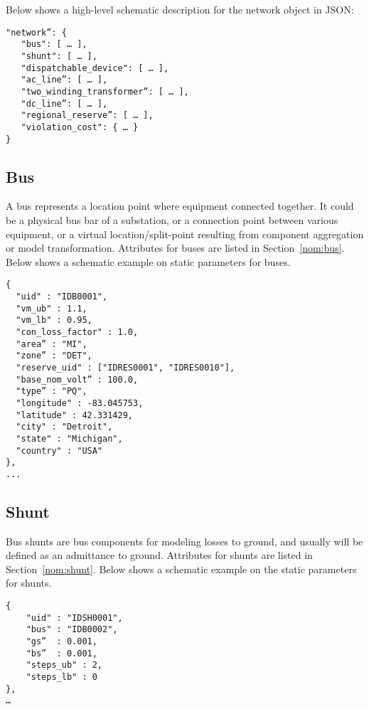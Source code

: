 Below shows a high-level schematic description for the network object in JSON:
\begin{verbatim}
"network”: {
   "bus": [ … ],
   "shunt": [ … ],
   "dispatchable_device": [ … ],
   "ac_line”: [ … ],
   "two_winding_transformer”: [ … ],
   "dc_line”: [ … ],   
   "regional_reserve”: [ … ],
   "violation_cost": { … }
}    
\end{verbatim}


\subsection{Bus}
\label{sec:bus}
A bus represents a location point where equipment connected together.
It could be a physical bus bar of a substation, or 
a connection point between various equipment, 
or a virtual location/split-point resulting from
component aggregation or model transformation.
Attributes for buses are listed in Section~\ref{nom:bus}.
Below shows a schematic example on static parameters for buses.
\begin{verbatim}
{
  "uid" : "IDB0001",
  "vm_ub" : 1.1,
  "vm_lb" : 0.95,
  "con_loss_factor" : 1.0,
  "area” : "MI",
  "zone” : "DET",
  "reserve_uid" : ["IDRES0001", "IDRES0010"],  
  "base_nom_volt” : 100.0,
  "type” : "PQ",
  "longitude" : -83.045753,
  "latitude" : 42.331429,
  "city" : "Detroit",
  "state" : "Michigan",
  "country" : "USA"
},
...
\end{verbatim}


\subsection{Shunt}
\label{sec:shunt}
Bus shunts are bus components for modeling losses to ground, and 
usually will be defined as an admittance to ground.
Attributes for shunts are listed in Section~\ref{nom:shunt}.
Below shows a schematic example on the static parameters for shunts.
\begin{verbatim}
{
    "uid" : "IDSH0001",
    "bus" : "IDB0002",
    "gs”  : 0.001,
    "bs”  : 0.001,
    "steps_ub" : 2,
    "steps_lb" : 0
},
…    
\end{verbatim}



